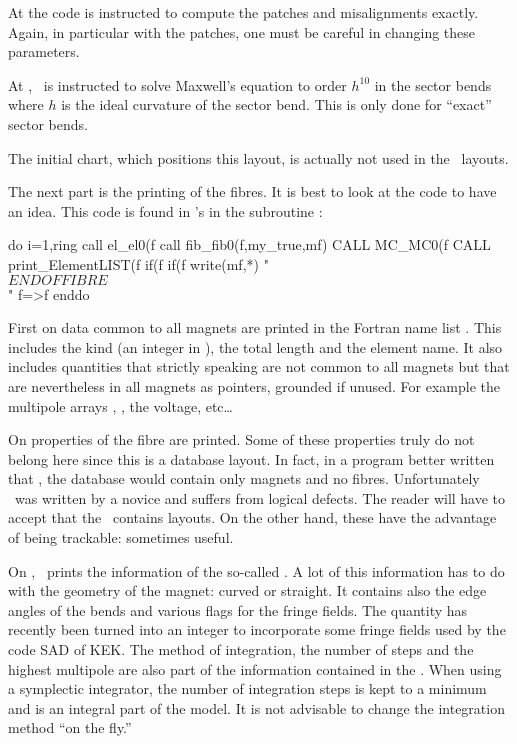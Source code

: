 {{At  the code is instructed to compute the patches and misalignments exactly. Again, in particular with the patches, one must be careful in changing these parameters.

At , \PTC\ is instructed to solve Maxwell's equation to order $h^{10}$ in the sector bends where $h$ is the ideal curvature of the sector bend. This is only done for ``exact'' sector bends. 

The initial chart, which positions this layout, is actually not used in the \DNA\ layouts. 

The next part is the printing of the fibres. It is best to look at the code to have an idea. This code is found in \PTC 's  in the subroutine :

\begin{ptccode}
do i=1,ring%
  call el_el0(f%
  call fib_fib0(f,my_true,mf)    \label{lin:fib:1}
  CALL MC_MC0(f%
  CALL print_ElementLIST(f%
  if(f%
  if(f%
 write(mf,*) " $$$$$$$$$$$$$$$$$ END OF FIBRE $$$$$$$$$$$$$$$$$"
 f=>f%
enddo
\end{ptccode}


First on  data common to all magnets are printed in the Fortran name list .  This includes the kind (an integer in \PTC ), the total length and the element name. It also includes quantities that strictly speaking are not common to all magnets but that are nevertheless in all magnets as  pointers, grounded if unused. For example the multipole arrays ,  , the voltage, etc\ldots


On  properties of the fibre are printed. Some of these properties truly do not belong here since this is a database layout. In fact, in a program better written that \PTC , the database would contain only magnets and no fibres. Unfortunately \PTC\ was written by a novice and suffers from logical defects. The reader will have to accept that the \DNA\ contains layouts. On the other hand, these have the advantage of being trackable: sometimes useful.

 On , \PTC\ prints the information of the so-called . A lot of this information has to do with the geometry of the magnet: curved or straight. It contains also the edge angles of the bends and various flags for the fringe fields. The quantity  has recently been turned into an integer to incorporate some fringe fields used by the code SAD of KEK. The method of integration, the number of steps and the highest multipole are also part of the information contained in the . When using a symplectic integrator, the number of integration steps is kept to a minimum and is an integral part of the model. It is not advisable to change the integration method ``on the fly.''

}}

